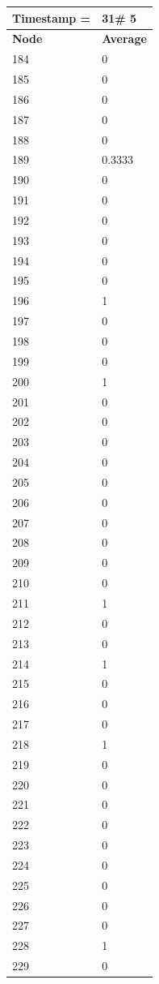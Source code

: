 \begin{tabular}{|l||l|}
\hline
\textbf{Timestamp =} & \textbf{31}\# 5\\\hline
	\textbf{Node} & \textbf{Average} \\ \hline
\hline
	184 & 0 \\ \hline
	185 & 0 \\ \hline
	186 & 0 \\ \hline
	187 & 0 \\ \hline
	188 & 0 \\ \hline
	189 & 0.3333 \\ \hline
	190 & 0 \\ \hline
	191 & 0 \\ \hline
	192 & 0 \\ \hline
	193 & 0 \\ \hline
	194 & 0 \\ \hline
	195 & 0 \\ \hline
	196 & 1 \\ \hline
	197 & 0 \\ \hline
	198 & 0 \\ \hline
	199 & 0 \\ \hline
	200 & 1 \\ \hline
	201 & 0 \\ \hline
	202 & 0 \\ \hline
	203 & 0 \\ \hline
	204 & 0 \\ \hline
	205 & 0 \\ \hline
	206 & 0 \\ \hline
	207 & 0 \\ \hline
	208 & 0 \\ \hline
	209 & 0 \\ \hline
	210 & 0 \\ \hline
	211 & 1 \\ \hline
	212 & 0 \\ \hline
	213 & 0 \\ \hline
	214 & 1 \\ \hline
	215 & 0 \\ \hline
	216 & 0 \\ \hline
	217 & 0 \\ \hline
	218 & 1 \\ \hline
	219 & 0 \\ \hline
	220 & 0 \\ \hline
	221 & 0 \\ \hline
	222 & 0 \\ \hline
	223 & 0 \\ \hline
	224 & 0 \\ \hline
	225 & 0 \\ \hline
	226 & 0 \\ \hline
	227 & 0 \\ \hline
	228 & 1 \\ \hline
	229 & 0 \\ \hline
\end{tabular}
